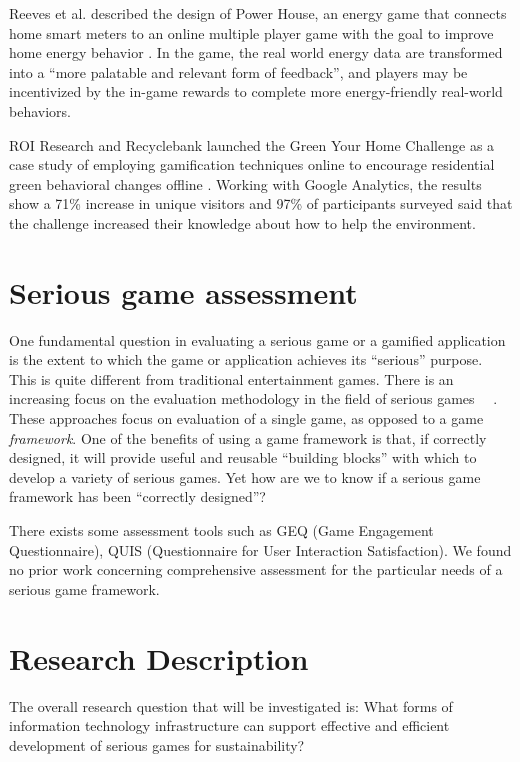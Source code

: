 Reeves et al. described the design of Power House, an energy game that connects
home smart meters to an online multiple player game with the goal to improve
home energy behavior \cite{Reeves2011powerhouse}. In the game, the real world
energy data are transformed into a ``more palatable and relevant form of
feedback'', and players may be incentivized by the in-game rewards to complete
more energy-friendly real-world behaviors.

ROI Research and Recyclebank launched the Green Your Home Challenge as a case
study of employing gamification techniques online to
encourage residential green behavioral changes offline \cite{gamingforgood}.
Working with Google Analytics, the results show a 71\% increase in unique
visitors and 97\% of participants surveyed said that the challenge increased
their knowledge about how to help the environment.

\section{Serious game assessment}

One fundamental question in evaluating a serious game or a gamified application is the 
extent to which the game or application achieves its ``serious'' purpose. This is quite different from traditional entertainment games. There is an increasing
focus on the evaluation methodology in the field of serious games ~\cite{Mayer2012233}~\cite{harteveld2010triadic}. These approaches focus on evaluation of a single game, as opposed to a game {\em
  framework}. One of the benefits of 
using a game framework is that, if correctly designed, it will provide useful and
reusable ``building blocks'' with which to develop a variety of serious games. Yet how are we to know
 if a serious game framework has been ``correctly designed''?

There exists some assessment tools such as GEQ (Game Engagement Questionnaire)\cite{brockmyer2009development}, QUIS (Questionnaire for User Interaction Satisfaction)\cite{harper1993improving}. We found no prior work concerning comprehensive assessment for 
the particular needs of a serious game framework.

\section{Research Description}

The overall research question that will be investigated is:
What forms of information technology infrastructure can support effective and efficient development of serious games for sustainability?

